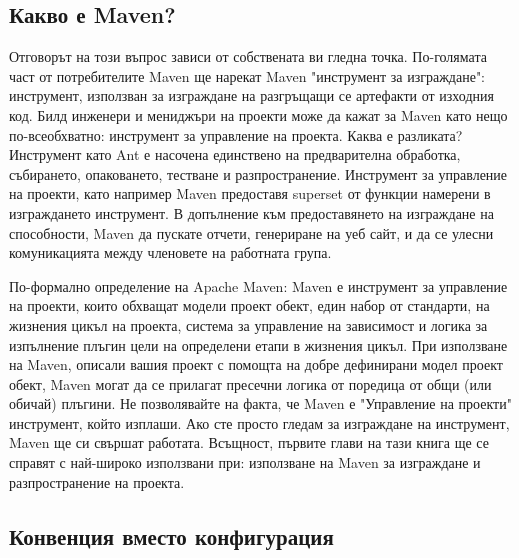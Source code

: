\subsection{Какво е Maven?} 
Отговорът на този въпрос зависи от собствената ви
гледна точка. По-голямата част от потребителите Maven ще нарекат Maven
"инструмент за изграждане": инструмент, използван за изграждане на
разгръщащи се артефакти от изходния код. Билд инженери и мениджъри на
проекти може да кажат за Maven като нещо по-всеобхватно: инструмент за
управление на проекта. Каква е разликата? Инструмент като Ant е
насочена единствено на предварителна обработка, събирането,
опаковането, тестване и разпространение. Инструмент за управление на
проекти, като например Maven предоставя superset от функции намерени в
изграждането инструмент. В допълнение към предоставянето на изграждане
на способности, Maven да пускате отчети, генериране на уеб сайт, и да
се улесни комуникацията между членовете на работната група.

По-формално определение на Apache Maven: Maven е инструмент за
управление на проекти, които обхващат модели проект обект, един набор
от стандарти, на жизнения цикъл на проекта, система за управление на
зависимост и логика за изпълнение плъгин цели на определени етапи в
жизнения цикъл. При използване на Maven, описали вашия проект с
помощта на добре дефинирани модел проект обект, Maven могат да се
прилагат пресечни логика от поредица от общи (или обичай) плъгини.  Не
позволявайте на факта, че Maven е "Управление на проекти" инструмент,
който изплаши. Ако сте просто гледам за изграждане на инструмент,
Maven ще си свършат работата. Всъщност, първите глави на тази книга ще
се справят с най-широко използвани при: използване на Maven за
изграждане и разпространение на проекта.
\subsection{Конвенция вместо конфигурация}

